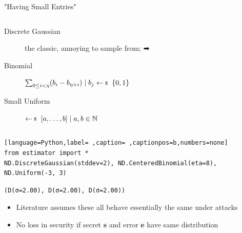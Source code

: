 \documentclass[table,10pt,aspectratio=169]{beamer}
\renewcommand{\vec}[1]{\ensuremath{\mathbf{#1}}\xspace}
\begin{document}
\begin{frame}[label={sec:org922b28b},fragile]{"Having Small Entries"}
 \begin{columns}
\begin{column}{0.5\columnwidth}
\begin{description}
\item[{Discrete Gaussian}] the classic, annoying to sample from; ➡
\item[{Binomial}] \(\sum_{0 \leq i < \eta} (b_{i} - b_{\eta+i}) \mid b_{j} \sample \bin\)
\item[{Small Uniform}] \(\sample [a,\ldots,b] \mid a,b \in \NN\)
\end{description}
\end{column}

\begin{column}{0.5\columnwidth}
\end{column}
\end{columns}

\begin{lstlisting}[language=Python,label= ,caption= ,captionpos=b,numbers=none]
from estimator import *
ND.DiscreteGaussian(stddev=2), ND.CenteredBinomial(eta=8), ND.Uniform(-3, 3)
\end{lstlisting}

\begin{verbatim}
(D(σ=2.00), D(σ=2.00), D(σ=2.00))
\end{verbatim}


\begin{itemize}
\item Literature assumes these all behave essentially the same under attacks
\item No loss in security if secret \(\vec{s}\) and error \(\vec{e}\) have same distribution \cite{C:ACPS09}
\end{itemize}
\end{frame}
\end{document}
